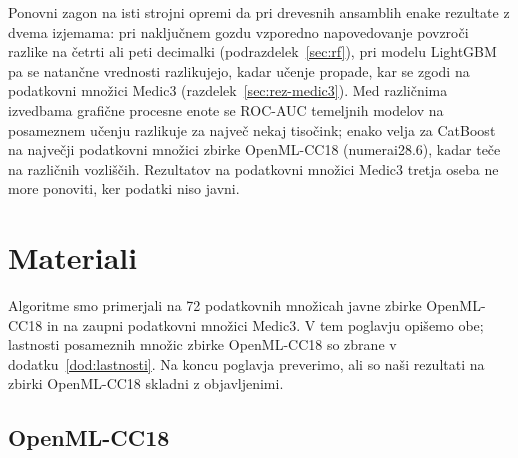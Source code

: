 \documentclass[a4paper,12pt,openright]{book}
\begin{document}
Ponovni zagon na isti strojni opremi da pri drevesnih ansamblih enake
rezultate z dvema izjemama: pri naključnem gozdu vzporedno napovedovanje
povzroči razlike na četrti ali peti decimalki (podrazdelek~\ref{sec:rf}), pri
modelu LightGBM pa se natančne vrednosti razlikujejo, kadar učenje propade, kar
se zgodi na podatkovni množici Medic3 (razdelek~\ref{sec:rez-medic3}). Med
različnima izvedbama grafične procesne enote se ROC-AUC temeljnih modelov na
posameznem učenju razlikuje za največ nekaj tisočink; enako velja za CatBoost
na največji podatkovni množici zbirke OpenML-CC18 (numerai28.6), kadar teče na
različnih vozliščih. Rezultatov na
podatkovni množici Medic3 tretja oseba ne more ponoviti, ker podatki niso
javni.

\chapter{Materiali}
\label{ch:podatki}

Algoritme smo primerjali na 72 podatkovnih množicah javne zbirke OpenML-CC18
in na zaupni podatkovni množici Medic3. V tem poglavju opišemo obe; lastnosti
posameznih množic zbirke OpenML-CC18 so zbrane v dodatku~\ref{dod:lastnosti}.
Na koncu poglavja preverimo, ali so naši rezultati na zbirki OpenML-CC18
skladni z objavljenimi.

\section{OpenML-CC18}
\label{sec:cc18}
\end{document}
